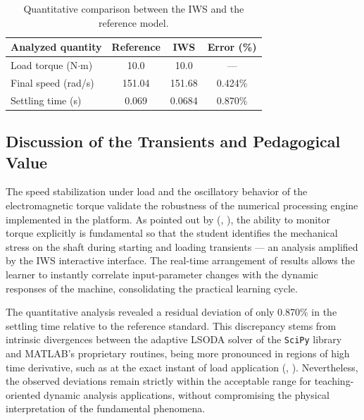\documentclass[a4paper]{ifacconf}
\begin{document}
\begin{table}[htbp]
\centering
\caption{Quantitative comparison between the IWS and the reference model.}
\label{tab:validacao_en}
\begin{tabular}{lccc}
\hline
\textbf{Analyzed quantity} & \textbf{Reference} & \textbf{IWS} & \textbf{Error (\%)} \\ \hline
Load torque (N$\cdot$m)        & 10.0                & 10.0          & ---                \\
Final speed (rad/s)            & 151.04              & 151.68        & 0.424\%            \\
Settling time (s)              & 0.069               & 0.0684        & 0.870\%            \\ \hline
\end{tabular}
\end{table}

\subsection{Discussion of the Transients and Pedagogical Value}

The speed stabilization under load and the oscillatory behavior of the electromagnetic torque validate the robustness of the numerical processing engine implemented in the platform. As pointed out by (\citeauthor{aktaibi2011dynamic}, \citeyear{aktaibi2011dynamic}), the ability to monitor torque explicitly is fundamental so that the student identifies the mechanical stress on the shaft during starting and loading transients --- an analysis amplified by the IWS interactive interface. The real-time arrangement of results allows the learner to instantly correlate input-parameter changes with the dynamic responses of the machine, consolidating the practical learning cycle.

The quantitative analysis revealed a residual deviation of only 0.870\% in the settling time relative to the reference standard. This discrepancy stems from intrinsic divergences between the adaptive LSODA solver of the \texttt{SciPy} library and MATLAB's proprietary routines, being more pronounced in regions of high time derivative, such as at the exact instant of load application (\citeauthor{li2010simulation}, \citeyear{li2010simulation}). Nevertheless, the observed deviations remain strictly within the acceptable range for teaching-oriented dynamic analysis applications, without compromising the physical interpretation of the fundamental phenomena.
\end{document}
